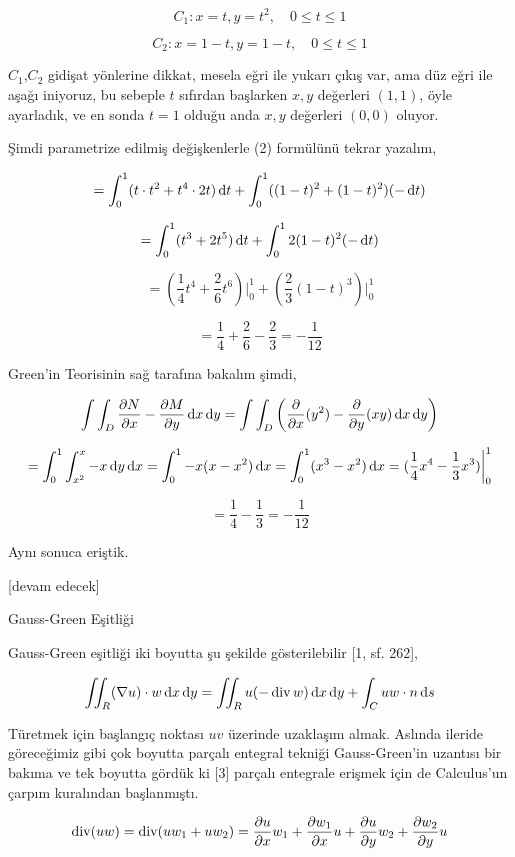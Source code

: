 \documentclass[12pt,fleqn]{article}\usepackage{../../common}
\begin{document}
$$
C_1: x = t, y = t^2, \quad 0 \le t \le 1
$$

$$
C_2: x = 1-t, y = 1-t, \quad 0 \le t \le 1
$$

$C_1$,$C_2$ gidişat yönlerine dikkat, mesela eğri ile yukarı çıkış var, ama düz
eğri ile aşağı iniyoruz, bu sebeple $t$ sıfırdan başlarken $x,y$ değerleri
$(1,1)$, öyle ayarladık, ve en sonda $t=1$ olduğu anda $x,y$ değerleri $(0,0)$
oluyor. 

Şimdi parametrize edilmiş değişkenlerle (2) formülünü tekrar yazalım,

$$
= \int_{0}^{1} ( t \cdot t^2 + t^4 \cdot 2t ) \,\mathrm{d} t +
\int_{0}^{1} ((1-t)^2 + (1-t)^2) (-\,\mathrm{d} t)
$$

$$
= \int_{0}^{1} (t^3 + 2t^5) \,\mathrm{d} t + \int _{0}^{1} 2 (1-t)^2 (-\,\mathrm{d} t)
$$

$$
= (\frac{1}{4} t^4 + \frac{2}{6} t^6) \big\vert_{0}^{1} +
(\frac{2}{3} (1-t)^3 ) \big\vert_{0}^{1}
$$

$$
= \frac{1}{4} + \frac{2}{6} - \frac{2}{3} = -\frac{1}{12}
$$

Green'in Teorisinin sağ tarafına bakalım şimdi, 

$$
\int \int_D \frac{\partial N}{\partial x} - \frac{\partial M}{\partial y} \,\mathrm{d} x \,\mathrm{d} y =
\int \int_D \left(
\frac{\partial }{\partial x}(y^2) - \frac{\partial }{\partial y}(xy) \,\mathrm{d} x \,\mathrm{d} y
\right)
$$

$$
= \int_{0}^{1} \int_{x^2}^{x} -x \,\mathrm{d} y \,\mathrm{d} x =
\int_{0}^{1} -x (x-x^2) \,\mathrm{d} x =
\int_{0}^{1} (x^3 - x^2) \,\mathrm{d} x = (\frac{1}{4} x^4 - \frac{1}{3} x^3 ) \bigg\vert_{0}^{1}
$$

$$
= \frac{1}{4} - \frac{1}{3} = -\frac{1}{12}
$$

Aynı sonuca eriştik.

[devam edecek]

Gauss-Green Eşitliği

Gauss-Green eşitliği iki boyutta şu şekilde gösterilebilir [1, sf. 262],

$$
\iint_R (\nabla u ) \cdot w \,\mathrm{d} x \,\mathrm{d} y =
\iint_R u (- \operatorname{div} w) \,\mathrm{d} x \,\mathrm{d} y + \int_C u w \cdot n \,\mathrm{d} s
$$

Türetmek için başlangıç noktası $uv$ üzerinde uzaklaşım almak. Aslında
ileride göreceğimiz gibi çok boyutta parçalı entegral tekniği Gauss-Green'in
uzantısı bir bakıma ve tek boyutta gördük ki [3] parçalı entegrale erişmek
için de Calculus'un çarpım kuralından başlanmıştı.

$$
\operatorname{div} (uw) = \operatorname{div} (u w_1 + u w_2) =
\frac{\partial u}{\partial x} w_1 +
\frac{\partial w_1}{\partial x} u +
\frac{\partial u}{\partial y} w_2 +
\frac{\partial w_2}{\partial y} u 
$$
\end{document}
